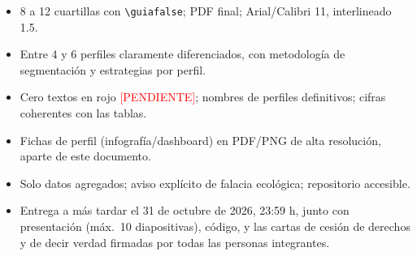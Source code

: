 \documentclass[11pt,letterpaper]{article}
\newif\ifguia
\begin{document}
\begin{guia}
\begin{itemize}
  \item 8 a 12 cuartillas con \verb|\guiafalse|; PDF final; Arial/Calibri 11, interlineado 1.5.
  \item Entre 4 y 6 perfiles claramente diferenciados, con metodolog\'ia de segmentaci\'on y estrategias por perfil.
  \item Cero textos en rojo \textcolor{red}{[PENDIENTE]}; nombres de perfiles definitivos; cifras coherentes con las tablas.
  \item Fichas de perfil (infograf\'ia/dashboard) en PDF/PNG de alta resoluci\'on, aparte de este documento.
  \item Solo datos agregados; aviso expl\'icito de falacia ecol\'ogica; repositorio accesible.
  \item Entrega a m\'as tardar el 31 de octubre de 2026, 23:59 h, junto con presentaci\'on (m\'ax.\ 10 diapositivas), c\'odigo, y las cartas de cesi\'on de derechos y de decir verdad firmadas por todas las personas integrantes.
\end{itemize}
\end{guia}
\end{document}
